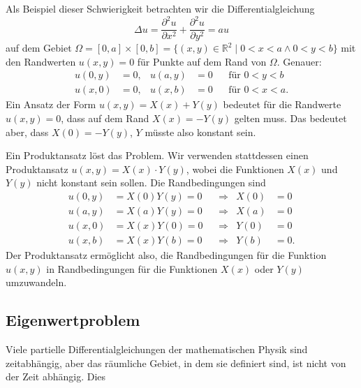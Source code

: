 Als Beispiel dieser Schwierigkeit betrachten wir die Differentialgleichung
\[
\Delta u
=
\frac{\partial^2 u}{\partial x^2}
+
\frac{\partial^2 u}{\partial y^2}
=
a u
\]
auf dem Gebiet
$\Omega = [0,a]\times [0,b] = \{(x,y)\in\mathbb{R}^2\mid 0<x<a\wedge 0<y<b\}$
mit den Randwerten $u(x,y)=0$ für Punkte auf dem Rand von $\Omega$.
Genauer:
\[
\begin{aligned}
u(0,y) &= 0,& u(a,y) &= 0&&\text{für $0<y<b$} \\
u(x,0) &= 0,& u(x,b) &= 0&&\text{für $0<x<a$}.
\end{aligned}
\]
Ein Ansatz der Form $u(x,y)=X(x) + Y(y)$ bedeutet für die
Randwerte $u(x,y)=0$, dass auf dem Rand $X(x)=-Y(y)$ gelten muss.
Das bedeutet aber, dass $X(0) = -Y(y)$, $Y$ müsste also konstant
sein.

Ein Produktansatz löst das Problem.
Wir verwenden stattdessen einen Produktansatz
$u(x,y) = X(x)\cdot Y(y)$, wobei die Funktionen $X(x)$ und $Y(y)$
nicht konstant sein sollen.
Die Randbedingungen sind
\[
\begin{aligned}
u(0,y) &= X(0) Y(y) = 0&&\Rightarrow& X(0)&=0\\
u(a,y) &= X(a) Y(y) = 0&&\Rightarrow& X(a)&=0\\
u(x,0) &= X(x) Y(0) = 0&&\Rightarrow& Y(0)&=0\\
u(x,b) &= X(x) Y(b) = 0&&\Rightarrow& Y(b)&=0.
\end{aligned}
\]
Der Produktansatz ermöglicht also, die Randbedingungen für die Funktion
$u(x,y)$ in Randbedingungen für die Funktionen $X(x)$ oder $Y(y)$
umzuwandeln.

%
%
\subsection{Eigenwertproblem}
Viele partielle Differentialgleichungen der mathematischen Physik
sind zeitabhängig, aber das räumliche Gebiet, in dem sie 
definiert sind, ist nicht von der Zeit abhängig.
Dies 

